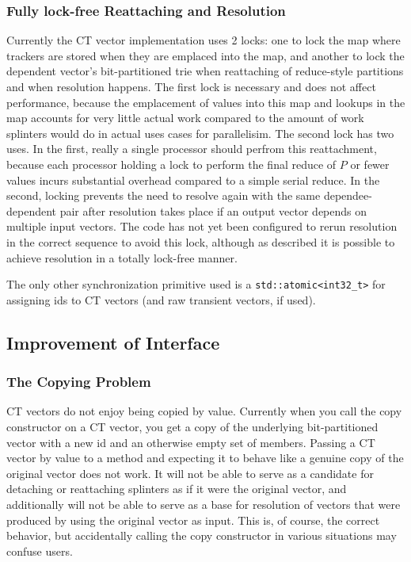 \documentclass[pageno]{jpaper}
\begin{document}
\subsubsection{Fully lock-free Reattaching and Resolution}
Currently the CT vector implementation uses 2 locks: one to lock the map where
trackers are stored when they are emplaced into the map, and another to lock the
dependent vector's bit-partitioned trie when reattaching of reduce-style
partitions and when resolution happens. The first lock is necessary and does not
affect performance, because the emplacement of values into this map
and lookups in the map accounts for very little actual work compared to the
amount of work splinters would do in actual uses cases for parallelisim. The
second lock has two uses. In the first, really a single processor should perfrom
this reattachment, because each processor holding a lock to perform the final
reduce of $P$ or fewer values incurs substantial overhead compared to a simple
serial reduce. In the second, locking prevents the need to resolve again with
the same dependee-dependent pair after resolution takes place if an output
vector depends on multiple input vectors. The code has not yet been configured
to rerun resolution in the correct sequence to avoid this lock, although as
described it is possible to achieve resolution in a totally
lock-free manner.

The only other synchronization primitive used is a
\texttt{std::atomic<int32\_t>} for assigning ids to CT vectors (and raw
transient vectors, if used).

\subsection{Improvement of Interface}

\subsubsection{The Copying Problem}
CT vectors do not enjoy being copied by value. Currently when you call the copy
constructor on a CT vector, you get a copy of the underlying bit-partitioned
vector with a new id and an otherwise empty set of members. Passing a CT vector
by value to a method and expecting it to behave like a genuine copy of the
original vector does not work. It will not be able to serve as a candidate for
detaching or reattaching splinters as if it were the original vector, and
additionally will not be able to serve as a base for resolution of vectors that
were produced by using the original vector as input. This is, of course, the
correct behavior, but accidentally calling the copy constructor in various
situations may confuse users.
\end{document}
